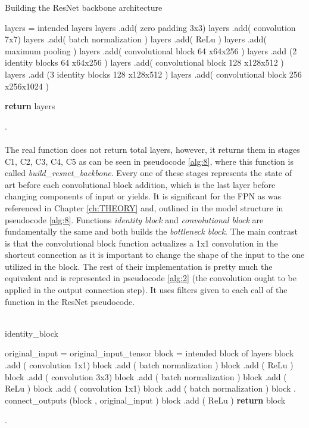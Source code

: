  \begin{algorithm}[H] \label{alg:1}
  \caption{Building the ResNet backbone architecture}
  \SetAlgoLined
  \DontPrintSemicolon
 layers = intended layers\;
 layers .add( zero padding 3x3)\;
 layers .add( convolution 7x7)\;   
 layers .add( batch normalization )\;
 layers .add( ReLu )\;
 layers .add( maximum pooling )\;
 layers .add( convolutional block 64 x64x256 )\;
 layers .add (2 identity blocks 64 x64x256 )\;
 layers .add( convolutional block 128 x128x512 )\;
 layers .add (3 identity blocks 128 x128x512 )\;
 layers .add( convolutional block 256 x256x1024 )\;


\textbf{return} layers\;   
 \end{algorithm}
.\\
\\
The real function does not return total layers, however, it returns them in stages  C1, C2, C3, C4, C5 as can be seen in pseudocode \ref{alg:8}, where this function is called  \textit{build\_resnet\_backbone}. Every one of these stages represents the state of art  before each convolutional block addition, which is the last layer before changing components of input or yields. It is significant for the FPN as was referenced in Chapter \ref{ch:THEORY} and, outlined in the model structure in pseudocode \ref{alg:8}. Functions \textit{identity block} and \textit{convolutional block} are fundamentally the same and both builds the \textit{bottleneck block}. The main contrast is that the convolutional block function actualizes a 1x1 convolution in the shortcut connection as it is important to change the shape of the input to the one utilized in the block. The rest of their implementation is pretty much the equivalent and is represented in pseudocode \ref{alg:2} (the convolution ought to be applied in the output connection step). It uses filters given to each call of the function in the ResNet pseudocode.
\\
\\
\begin{algorithm}[H] \label{alg:2}
  \caption{identity\_block}
  \SetAlgoLined
  \DontPrintSemicolon
  original\_input = original\_input\_tensor\;
  block = intended block of layers\;
   block .add ( convolution 1x1)\;
   block .add ( batch normalization )\;
   block .add ( ReLu )\;
   block .add ( convolution 3x3)\;
   block .add ( batch normalization )\;
   block .add ( ReLu )\;
   block .add ( convolution 1x1)\;
    block .add ( batch normalization )\;
   block . connect\_outputs (block , original\_input )\;
   block .add ( ReLu )\;
   \textbf{return} block\;
  
  \end{algorithm}
.\\
\\
